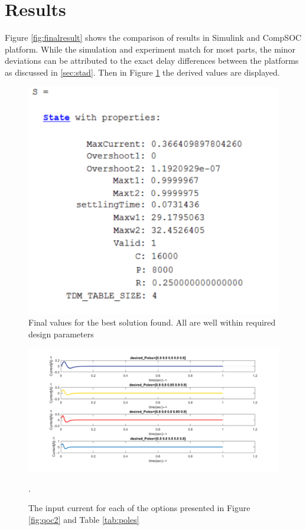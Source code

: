 \pagebreak
\section{Results}

Figure \ref{fig:finalresult} shows the comparison of results in Simulink and CompSOC platform. While the simulation and experiment match for most parts, the minor deviations can be attributed to the exact delay differences between the platforms as discussed in \ref{sec:stad}. Then in Figure \ref{fig:Sresult} the derived values are displayed.


\begin{figure}[h!]
	\begin{center}
		\includegraphics[width=0.5\linewidth]{img/S}
		\caption{Final values for the best solution found. All are well within required design parameters}
		\label{fig:Sresult}
	\end{center}
\end{figure}

\begin{figure}[h]
	\begin{center}
		\includegraphics[width=0.8\linewidth]{img/current}
		\caption{The input current for each of the options presented in Figure \ref{fig:qoc2} and Table \ref{tab:poles}}.
		\label{fig:current}
	\end{center}
\end{figure}

